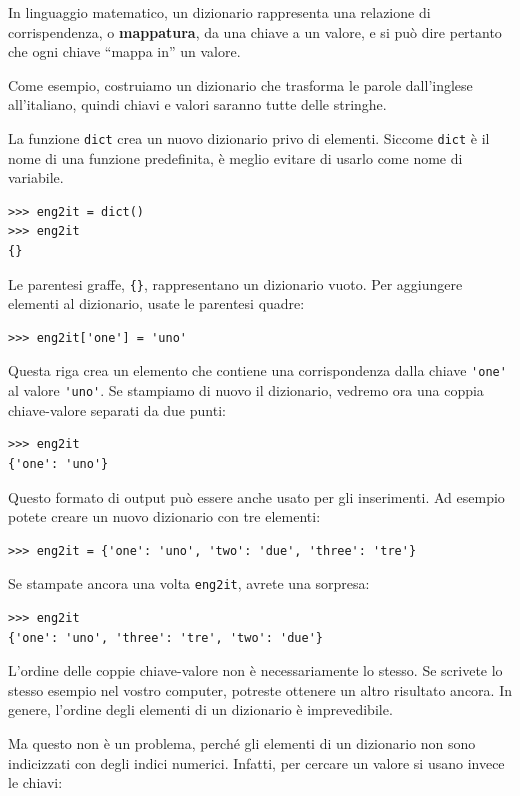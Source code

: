 \documentclass[10pt]{book}
\begin{document}
In linguaggio matematico, un dizionario rappresenta una relazione di corrispendenza, o {\bf mappatura}, da una chiave a un valore, e si può dire pertanto che ogni chiave ``mappa in'' un valore.

Come esempio, costruiamo un dizionario che trasforma le parole dall'inglese all'italiano, quindi chiavi e valori saranno tutte delle stringhe.

La funzione {\tt dict} crea un nuovo dizionario privo di elementi. Siccome {\tt dict} è il nome di una funzione predefinita, è meglio evitare di usarlo come nome di variabile.

\begin{verbatim}
>>> eng2it = dict()
>>> eng2it
{}
\end{verbatim}

Le parentesi graffe, \verb"{}", rappresentano un dizionario vuoto. Per aggiungere elementi al dizionario, usate le parentesi quadre:

\begin{verbatim}
>>> eng2it['one'] = 'uno'
\end{verbatim}
%
Questa riga crea un elemento che contiene una corrispondenza dalla chiave
\verb"'one'" al valore \verb"'uno'".  Se stampiamo di nuovo il dizionario, vedremo ora una coppia chiave-valore separati da due punti:

\begin{verbatim}
>>> eng2it
{'one': 'uno'}
\end{verbatim}
%
Questo formato di output può essere anche usato per gli inserimenti. Ad esempio potete creare un nuovo dizionario con tre elementi:

\begin{verbatim}
>>> eng2it = {'one': 'uno', 'two': 'due', 'three': 'tre'}
\end{verbatim}
%
Se stampate ancora una volta {\tt eng2it}, avrete una sorpresa:

\begin{verbatim}
>>> eng2it
{'one': 'uno', 'three': 'tre', 'two': 'due'}
\end{verbatim}
%
L'ordine delle coppie chiave-valore non è necessariamente lo stesso. Se scrivete lo stesso esempio nel vostro computer, potreste ottenere un altro risultato ancora. In genere, l'ordine degli elementi di un dizionario è imprevedibile.

Ma questo non è un problema, perché gli elementi di un dizionario non sono indicizzati con degli indici numerici. Infatti, per cercare un valore si usano invece le chiavi:
\end{document}
